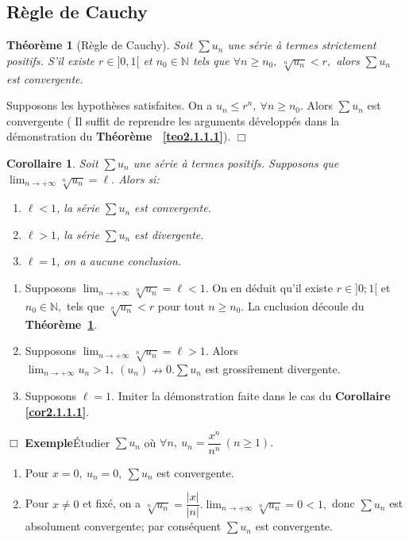 \documentclass[11pt, a4paper]{book}
\newtheorem{teo}{Th\'eor\`eme}[section]
\newtheorem{cor}{Corollaire}[section]
\newenvironment{pr}{\noindent {\bf Preuve} \noindent} {\hfill $\Box$\vskip 5mm}
\begin{document}
\subsection{R\`egle de Cauchy}
\begin{teo}[R\`egle de Cauchy] \label{teo2.1.1.2} Soit $\sum u_n$ une s\'erie \`a termes strictement positifs. S'il existe $r\in ]0,1[$ et $n_0 \in \mathbb{N}$ tels que $ \forall n \geq n_0,~ \sqrt[n]{u_n}< r,$ alors $\sum u_n$ est convergente.\end{teo}
\begin{pr}\quad Supposons les hypoth\`eses satisfaites. On a $u_n \leq r^n,~\forall n \geq n_0.$ Alors $\sum u_n$ est convergente ( Il suffit de reprendre les arguments d\'evelopp\'es dans la d\'emonstration du \textbf{Th\'eor\`eme~ \ref{teo2.1.1.1}}).
\end{pr}
\begin{cor} \label{cor2.1.2} Soit $\sum u_n$ une s\'erie \`a termes positifs. Supposons que ${\displaystyle \lim_{n\rightarrow+\infty}\sqrt[n]{u_n}=\ell}.$ Alors si: \begin{enumerate}
\item[*] $\ell<1$, la s\'erie $\sum u_n$ est convergente.
\item[*] $\ell>1$, la s\'erie $\sum u_n$ est divergente.
\item[*] $\ell=1$, on a aucune conclusion.
\end{enumerate} \end{cor}
\begin{pr}\quad \begin{enumerate}
\item[*] Supposons ${\displaystyle \lim_{n\rightarrow+\infty} \sqrt[n]{u_n}=\ell<1.}$ On en d\'eduit qu'il existe $r\in ]0;1[$ et $n_0 \in \mathbb{N},$ tels que $\sqrt[n]{u_n}<r$ pour tout $n\geq n_0$. La cnclusion d\'ecoule du \textbf{Th\'eor\`eme~\ref{teo2.1.1.2}}.
\item[*] Supposons ${\displaystyle \lim_{n\rightarrow+\infty} \sqrt[n]{u_n}=\ell>1}.$ Alors ${\displaystyle \lim_{n\rightarrow+\infty} u_n>1,~ (u_n)\nrightarrow0. \sum u_n}$ est grossi\`rement divergente.
\item[*] Supposons $\ell=1.$ Imiter la d\'emonstration faite dans le cas du \textbf{Corollaire \ref{cor2.1.1.1}}. 
\end{enumerate}
\end{pr}
\textbf{Exemple}\quad \'Etudier $\sum u_n$ o\`u $ \forall n, ~u_n= \dfrac{x^n}{n^n}~(n\geq1).$\\
\begin{enumerate}
\item[-] Pour $x=0,~ u_n=0,~ \sum u_n$ est convergente.
\item[-] Pour $x\neq 0$ et fix\'e, on a ${\displaystyle \sqrt[n]{u_n}=\dfrac{|x|}{|n|}. \lim_{n\rightarrow+\infty}\sqrt[n]{u_n}=0<1},$ donc $\sum u_n$ est absolument convergente; par cons\'equent $\sum u_n$ est convergente.
\end{enumerate}
\end{document}
